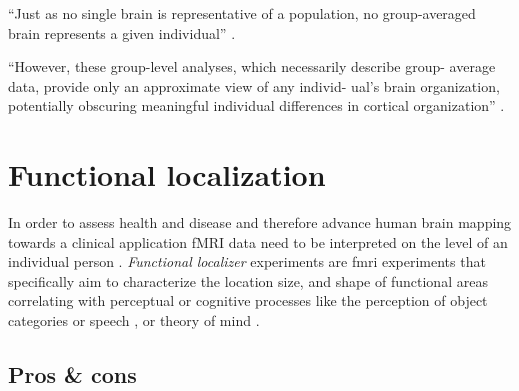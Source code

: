 ``Just as no single brain is representative of a population, no group-averaged
brain represents a given individual'' \citep{laumann2015functional}.

``However, these group-level analyses, which necessarily describe group- average
data, provide only an approximate view of any individ- ual’s brain organization,
potentially obscuring meaningful individual differences in cortical
organization'' \citep{laumann2015functional}.


\section{Functional localization}

%
In order to assess health and disease and therefore advance human brain mapping
towards a clinical application fMRI data need to be interpreted on the level of
an individual person \citep{dubois2016building, wegrzyn2018thought}.
%
\textit{Functional localizer} experiments \citep[e.g.,][for
reviews]{saxe2006divide, friston2006critique} are \ac{fmri} experiments that
specifically aim to characterize the location size, and shape of functional
areas correlating with perceptual or cognitive processes like the perception of
object categories \citep{kanwisher1997ffa} or speech
\citep{fernandez2001language}, or theory of mind \citep{spunt2014validating}.


\subsection{Pros \& cons}


